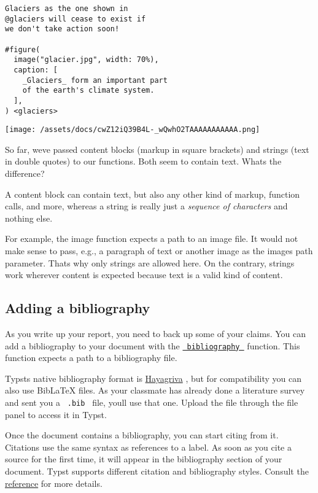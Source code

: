 \begin{verbatim}
Glaciers as the one shown in
@glaciers will cease to exist if
we don't take action soon!

#figure(
  image("glacier.jpg", width: 70%),
  caption: [
    _Glaciers_ form an important part
    of the earth's climate system.
  ],
) <glaciers>
\end{verbatim}

\texttt{[image: /assets/docs/cwZ12iQ39B4L-\_wQwhO2TAAAAAAAAAAA.png]}

So far, we\textquotesingle ve passed content blocks (markup in square
brackets) and strings (text in double quotes) to our functions. Both
seem to contain text. What\textquotesingle s the difference?

A content block can contain text, but also any other kind of markup,
function calls, and more, whereas a string is really just a
\emph{sequence of characters} and nothing else.

For example, the image function expects a path to an image file. It
would not make sense to pass, e.g., a paragraph of text or another image
as the image\textquotesingle s path parameter. That\textquotesingle s
why only strings are allowed here. On the contrary, strings work
wherever content is expected because text is a valid kind of content.

\subsection{Adding a bibliography}\label{bibliography}

As you write up your report, you need to back up some of your claims.
You can add a bibliography to your document with the
\href{/docs/reference/model/bibliography/}{\texttt{\ bibliography\ }}
function. This function expects a path to a bibliography file.

Typst\textquotesingle s native bibliography format is
\href{https://github.com/typst/hayagriva/blob/main/docs/file-format.md}{Hayagriva}
, but for compatibility you can also use BibLaTeX files. As your
classmate has already done a literature survey and sent you a
\texttt{\ .bib\ } file, you\textquotesingle ll use that one. Upload the
file through the file panel to access it in Typst.

Once the document contains a bibliography, you can start citing from it.
Citations use the same syntax as references to a label. As soon as you
cite a source for the first time, it will appear in the bibliography
section of your document. Typst supports different citation and
bibliography styles. Consult the
\href{/docs/reference/model/bibliography/\#parameters-style}{reference}
for more details.

